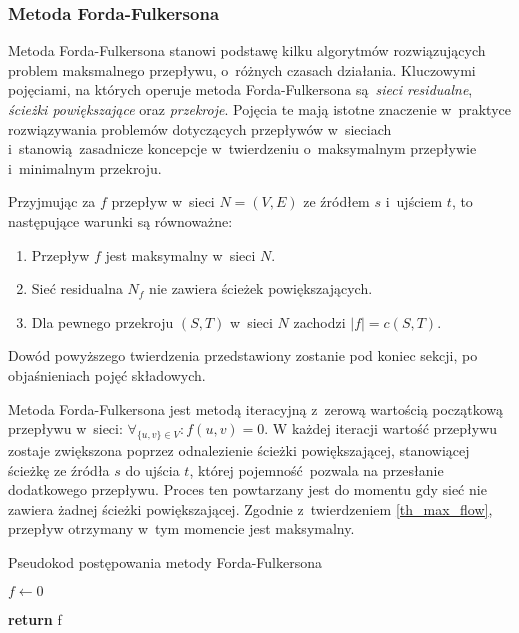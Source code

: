 \subsubsection{\textbf{Metoda Forda-Fulkersona}}
\par{
  Metoda Forda-Fulkersona stanowi podstawę kilku algorytmów rozwiązujących problem maksmalnego przepływu, o~różnych czasach działania.
  Kluczowymi pojęciami, na których operuje metoda Forda-Fulkersona są \emph{sieci residualne}, \emph{ścieżki powiększające} oraz \emph{przekroje}.
  Pojęcia te mają istotne znaczenie w~praktyce rozwiązywania problemów dotyczących przepływów w~sieciach i~stanowią zasadnicze koncepcje w~twierdzeniu o~maksymalnym przepływie i~minimalnym przekroju.
  \begin{theorem}
    Przyjmując za $f$ przepływ w~sieci $N=(V,E)$ ze źródłem $s$ i~ujściem $t$, to następujące warunki są równoważne:
    \begin{enumerate}
      \item Przepływ $f$ jest maksymalny w~sieci $N$.
      \item Sieć residualna $N_f$ nie zawiera ścieżek powiększających.
      \item Dla pewnego przekroju $(S, T)$ w~sieci $N$ zachodzi $|f|=c(S,T)$.
    \end{enumerate}
  \end{theorem}
  Dowód powyższego twierdzenia przedstawiony zostanie pod koniec sekcji, po objaśnieniach pojęć składowych.
}
\par{
  Metoda Forda-Fulkersona jest metodą iteracyjną z~zerową wartością początkową przepływu w~sieci: $\forall_{\{u,v\}\in V}: f(u,v)=0$.
  W każdej iteracji wartość przepływu zostaje zwiększona poprzez odnalezienie ścieżki powiększającej, stanowiącej ścieżkę ze źródła $s$ do ujścia $t$, której pojemność pozwala na przesłanie dodatkowego przepływu.
  Proces ten powtarzany jest do momentu gdy sieć nie zawiera żadnej ścieżki powiększającej.
  Zgodnie z~twierdzeniem \ref{th_max_flow}, przepływ otrzymany w~tym momencie jest maksymalny.
  \begin{algorithm}
    \caption{Pseudokod postępowania metody Forda-Fulkersona}\label{alg_fordFulkerson}
    \begin{algorithmic}[1]



        \State $f \gets 0$

        \EndWhile
        \State\textbf{return} f
      \EndFunction
  \end{algorithmic}
  \end{algorithm}
}
